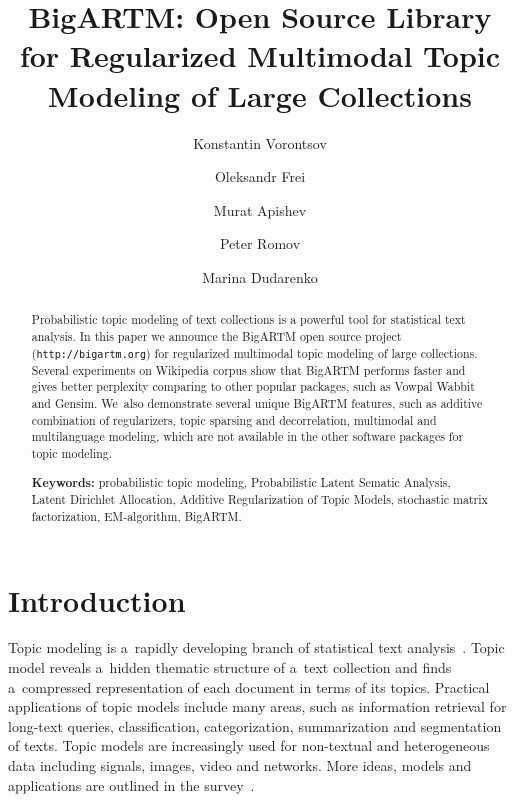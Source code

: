 \documentclass[russian,english]{llncs}
\begin{document}
\title{
    BigARTM: Open Source Library for
    Regularized Multimodal %
    Topic Modeling of Large Collections
}
\author{
    Konstantin Vorontsov
    \and
    Oleksandr Frei
    \and
    Murat Apishev
    \and
    Peter Romov
    \and
    Marina Dudarenko
}

\maketitle

\begin{abstract}
Probabilistic topic modeling of text collections is a powerful tool for statistical text analysis.
In this paper we announce the \mbox{BigARTM} open source project (\texttt{http://bigartm.org})
for regularized multimodal topic modeling of large collections.
Several experiments on Wikipedia corpus show that BigARTM performs faster and gives better perplexity
comparing to other popular packages, such as Vowpal Wabbit and Gensim.
We~also demonstrate several unique BigARTM features, such as
additive combination of regularizers,
topic sparsing and decorrelation,
multimodal and multilanguage modeling,
which are not available in the other software packages for topic modeling.

\vspace{1em}
\textbf{Keywords:}
    probabilistic topic modeling,
    Probabilistic Latent Sematic Analysis,
    Latent Dirichlet Allocation,
    Additive Regularization of Topic Models,
    stochastic matrix factorization,
    EM-algorithm,
    BigARTM.
\end{abstract}

\section{Introduction}

Topic modeling is a~rapidly developing branch of statistical text analysis~\cite{blei12ptm}.
Topic model reveals a~hidden thematic structure of a~text collection
and finds a~compressed representation of each document in terms of its topics.
Practical applications of topic models include many areas, such as
information retrieval for long-text queries,
classification, categorization, summarization and segmentation of texts.
Topic models are increasingly used for non-textual and heterogeneous data
including signals, images, video and networks.
More ideas, models and applications are outlined in the survey~\cite{daud10knowledge}.
\end{document}

